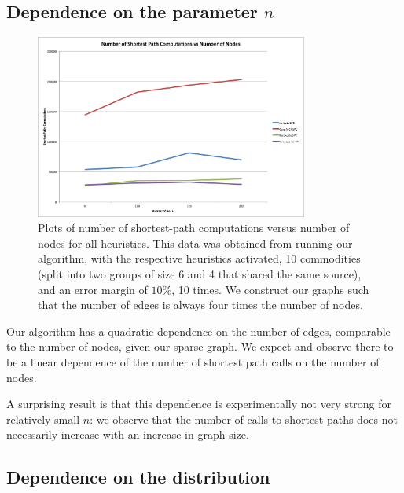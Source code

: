 \subsection{Dependence on the parameter $n$} \begin{figure} \begin{center}
\mbox{\includegraphics[width=0.8\textwidth]{figures/nodes.png}} \caption{Plots
of number of shortest-path computations versus number of nodes for all
heuristics. This data was obtained from running our algorithm, with the
respective heuristics activated, 10 commodities (split into two groups of size
6 and 4 that shared the same source), and an error margin of $10\%$, 10 times.
We construct our graphs such that the number of edges is always four times the
number of nodes. } \end{center} \end{figure}

Our algorithm has a quadratic dependence on the number of edges, comparable to
the number of nodes, given our sparse graph.  We expect and observe there to be
a linear dependence of the number of shortest path calls on the number of
nodes.

A surprising result is that this dependence is experimentally not very strong
for relatively small $n$: we observe that the number of calls to shortest paths
does not necessarily increase with an increase in graph size.

\subsection{Dependence on the distribution}

